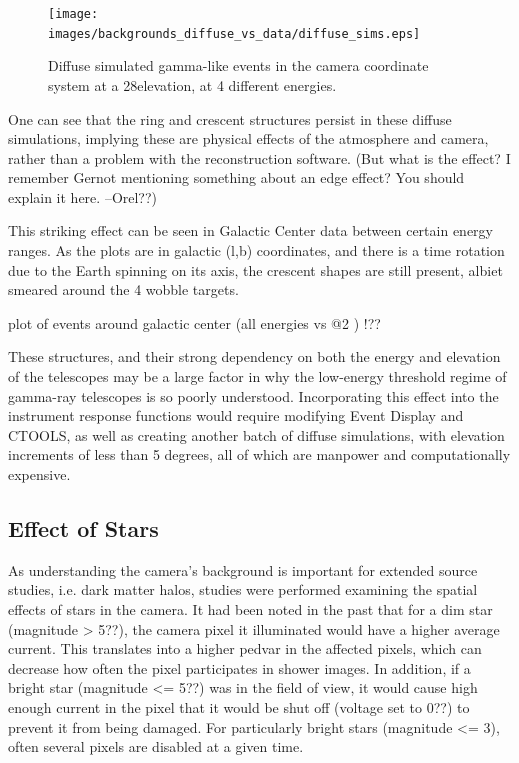     \begin{figure}[ht]
      \begin{center}
        \texttt{[image: images/backgrounds\_diffuse\_vs\_data/diffuse\_sims.eps]}
        \caption[Diffuse Simulated Backgrounds]{Diffuse simulated gamma-like events in the camera coordinate system at a 28\degree elevation, at 4 different energies.}\label{fig:back_simdiffuse}
      \end{center}
    \end{figure}

    One can see that the ring and crescent structures persist in these diffuse simulations, implying these are physical effects of the atmosphere and camera, rather than a problem with the reconstruction software.
    (But what is the effect? I remember Gernot mentioning something about an edge effect? You should explain it here. --Orel??)

    This striking effect can be seen in Galactic Center data between certain energy ranges.
    As the plots are in galactic (l,b) coordinates, and there is a time rotation due to the Earth spinning on its axis, the crescent shapes are still present, albiet smeared around the 4 wobble targets.

    plot of events around galactic center (all energies vs @2 \TeV ) !??
    
    These structures, and their strong dependency on both the energy and elevation of the telescopes may be a large factor in why the low-energy threshold regime of gamma-ray telescopes is so poorly understood.
    Incorporating this effect into the instrument response functions would require modifying Event Display and CTOOLS, as well as creating another batch of diffuse simulations, with elevation increments of less than 5 degrees, all of which are manpower and computationally expensive.
    
    

  \subsection{Effect of Stars}
    As understanding the camera's background is important for extended source studies, i.e. dark matter halos, studies were performed examining the spatial effects of stars in the camera.
    It had been noted in the past that for a dim star (magnitude > 5??), the camera pixel it illuminated would have a higher average current.
    This translates into a higher pedvar in the affected pixels, which can decrease how often the pixel participates in shower images.
    In addition, if a bright star (magnitude <= 5??) was in the field of view, it would cause high enough current in the pixel that it would be shut off (voltage set to 0??) to prevent it from being damaged.
    For particularly bright stars (magnitude <= 3), often several pixels are disabled at a given time.

